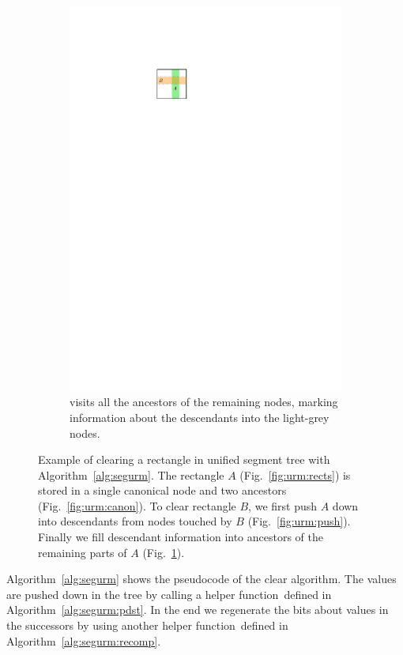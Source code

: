 \documentclass[english,gradu]{tktltiki2018}
\begin{document}
\begin{figure}
\begin{subfigure}[t]{0.4\textwidth}
		\includegraphics[width=\textwidth,page=5]{fig/uremove}
		\caption{\recomp visits all the ancestors of the remaining nodes, marking information about the descendants into the light-grey nodes.}\label{fig:urm:recomp}
	\end{subfigure}
	\caption{
	Example of clearing a rectangle in unified segment tree with Algorithm~\ref{alg:segurm}.
	The rectangle $A$ (Fig.~\ref{fig:urm:rects}) is stored in a single canonical node and two ancestors (Fig.~\ref{fig:urm:canon}).
	To clear rectangle $B$, we first push $A$ down into descendants from nodes touched by $B$ (Fig.~\ref{fig:urm:push}).
	Finally we fill descendant information into ancestors of the remaining parts of $A$ (Fig.~\ref{fig:urm:recomp}).
	}\label{fig:uremove}
\end{figure}

Algorithm~\ref{alg:segurm} shows the pseudocode of the clear algorithm.
The values are pushed down in the tree by calling a helper function~\pdst defined in Algorithm~\ref{alg:segurm:pdst}.
In the end we regenerate the bits about values in the successors by using another helper function~\recomp defined in Algorithm~\ref{alg:segurm:recomp}.
\end{document}
